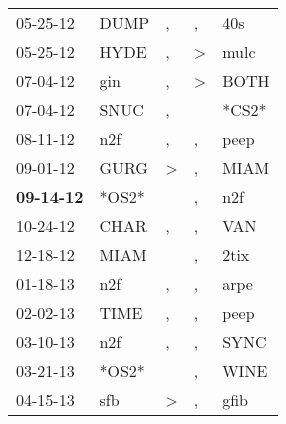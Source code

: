 \begin{supertabular}{p{0.07\textwidth}p{0.06\textwidth}p{0.02\textwidth}p{0.02\textwidth}p{0.06\textwidth}}
          05-25-12\textsuperscript{} &           DUMP\textsuperscript{} &                , &                , &            40s\textsuperscript{} \\
          05-25-12\textsuperscript{} &           HYDE\textsuperscript{} &                , &     \textgreater &           mulc\textsuperscript{} \\
          07-04-12\textsuperscript{} &            gin\textsuperscript{} &                , &     \textgreater &           BOTH\textsuperscript{} \\
          07-04-12\textsuperscript{} &           SNUC\textsuperscript{} &                , &                  &                            *CS2* \\
          08-11-12\textsuperscript{} &            n2f\textsuperscript{} &                , &                , &           peep\textsuperscript{} \\
          09-01-12\textsuperscript{} &           GURG\textsuperscript{} &     \textgreater &                , &           MIAM\textsuperscript{} \\
 \textbf{09-14-12\textsuperscript{}} &                            *OS2* &                  &                , &            n2f\textsuperscript{} \\
          10-24-12\textsuperscript{} &           CHAR\textsuperscript{} &                , &                , &            VAN\textsuperscript{} \\
          12-18-12\textsuperscript{} &           MIAM\textsuperscript{} &                  &                , &           2tix\textsuperscript{} \\
          01-18-13\textsuperscript{} &            n2f\textsuperscript{} &                , &                , &           arpe\textsuperscript{} \\
          02-02-13\textsuperscript{} &           TIME\textsuperscript{} &                , &                , &           peep\textsuperscript{} \\
          03-10-13\textsuperscript{} &            n2f\textsuperscript{} &                , &                , &           SYNC\textsuperscript{} \\
          03-21-13\textsuperscript{} &                            *OS2* &                  &                , &           WINE\textsuperscript{} \\
          04-15-13\textsuperscript{} &            sfb\textsuperscript{} &     \textgreater &                , &           gfib\textsuperscript{} \\

\end{supertabular}
